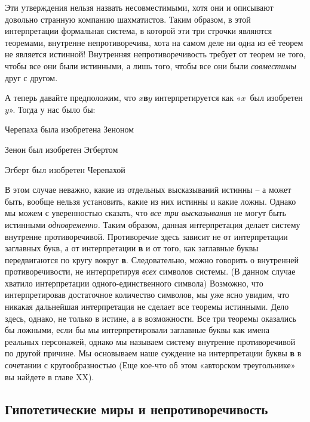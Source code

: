 \documentclass[../main.tex]{subfiles}
\begin{document}
Эти утверждения нельзя назвать несовместимыми, хотя они и описывают довольно странную компанию шахматистов. Таким образом, в этой интерпретации формальная система, в которой эти три строчки являются теоремами, внутренне непротиворечива, хота на самом деле ни одна из её теорем не является истинной! Внутренняя непротиворечивость требует от теорем не того, чтобы все они были истинными, а лишь того, чтобы все они были \emph{совместимы} друг с другом.

А теперь давайте предположим, что \textbf{$x$в$y$} интерпретируется как «$x$~был изобретен $y$».
Тогда у нас было бы:

\begin{block}
Черепаха была изобретена Зеноном

Зенон был изобретен Эгбертом

Эгберт был изобретен Черепахой
\end{block}

В этом случае неважно, какие из отдельных высказываний истинны \--- а может быть, вообще нельзя установить, какие из них истинны и какие ложны. Однако мы можем с уверенностью сказать, что \emph{все три высказывания} не могут быть истинными \emph{одновременно.} Таким образом, данная интерпретация делает систему внутренне противоречивой. Противоречие здесь зависит не от интерпретации заглавных букв, а от интерпретации \textbf{в} и от того, как заглавные буквы передвигаются по кругу вокруг \textbf{в}. Следовательно, можно говорить о внутренней противоречивости, не интерпретируя \emph{всех} символов системы. (В данном случае хватило интерпретации одного-единственного символа) Возможно, что интерпретировав достаточное количество символов, мы уже ясно увидим, что никакая дальнейшая интерпретация не сделает все теоремы истинными. Дело здесь, однако, не только в истине, а в возможности. Все три теоремы оказались бы ложными, если бы мы интерпретировали заглавные буквы как имена реальных персонажей, однако мы называем систему внутренне противоречивой по другой причине. Мы основываем наше суждение на интерпретации буквы \textbf{в} в сочетании с кругообразностью (Еще кое-что об этом «авторском треугольнике» вы найдете в главе XX).


\subsection{Гипотетические миры и непротиворечивость}
\end{document}
